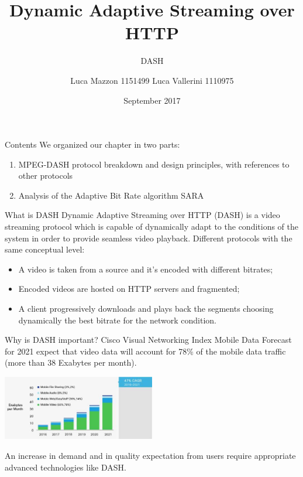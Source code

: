 \documentclass[10pt]{beamer}
\title{\vspace*{1.5cm}Dynamic Adaptive Streaming over HTTP}
\subtitle{DASH}
\date{\vspace*{1cm}\centering 19 September 2017}
\author{Luca Mazzon 1151499 \hfill Luca Vallerini 1110975}
\institute{\centering Computer Networks - Academic Year 2016/2017}
\begin{document}
\maketitle


\begin{frame}[fragile]{Contents}
We organized our chapter in two parts:
\begin{enumerate}
\item MPEG-DASH protocol breakdown and design principles, with references to other protocols
\item Analysis of the Adaptive Bit Rate algorithm SARA
\end{enumerate}
\end{frame}

\begin{frame}[fragile]{What is DASH}
Dynamic Adaptive Streaming over HTTP (DASH) is a video streaming protocol which is capable of dynamically adapt to the conditions of the system in order to provide seamless video playback.
\vfill
Different protocols with the same conceptual level:
\begin{itemize}
\item A video is taken from a source and it's encoded with different bitrates;
\item Encoded videos are hosted on HTTP servers and fragmented;
\item A client progressively downloads and plays back the segments choosing dynamically the best bitrate for the network condition.
\end{itemize}
\end{frame}

\begin{frame}[fragile]{Why is DASH important?}
Cisco Visual Networking Index Mobile Data Forecast for 2021 expect that video data will account for 78\% of the mobile data traffic (more than 38 Exabytes per month).

\centering
\includegraphics[width=0.5\textwidth]{img/Cisco}

An increase in demand and in quality expectation from users require appropriate advanced technologies like DASH.
\end{frame}
\end{document}
